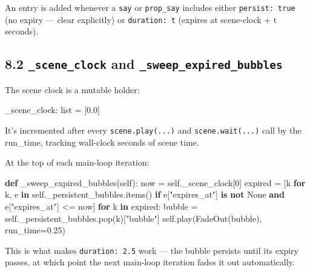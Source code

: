\documentclass[
  11pt,
]{book}
\newenvironment{Shaded}{}{}
\newcommand{\BuiltInTok}[1]{\textcolor[rgb]{0.00,0.50,0.00}{#1}}
\newcommand{\ControlFlowTok}[1]{\textcolor[rgb]{0.00,0.44,0.13}{\textbf{#1}}}
\newcommand{\DecValTok}[1]{\textcolor[rgb]{0.25,0.63,0.44}{#1}}
\newcommand{\FloatTok}[1]{\textcolor[rgb]{0.25,0.63,0.44}{#1}}
\newcommand{\KeywordTok}[1]{\textcolor[rgb]{0.00,0.44,0.13}{\textbf{#1}}}
\newcommand{\NormalTok}[1]{#1}
\newcommand{\OperatorTok}[1]{\textcolor[rgb]{0.40,0.40,0.40}{#1}}
\newcommand{\StringTok}[1]{\textcolor[rgb]{0.25,0.44,0.63}{#1}}
\newcommand{\VariableTok}[1]{\textcolor[rgb]{0.10,0.09,0.49}{#1}}
\begin{document}
An entry is added whenever a \texttt{say} or \texttt{prop\_say} includes
either \texttt{persist:\ true} (no expiry --- clear explicitly) or
\texttt{duration:\ t} (expires at scene-clock + t seconds).

\subsection{\texorpdfstring{8.2 \texttt{\_scene\_clock} and
\texttt{\_sweep\_expired\_bubbles}}{8.2 \_scene\_clock and \_sweep\_expired\_bubbles}}\label{scene_clock-and-_sweep_expired_bubbles}

The scene clock is a mutable holder:

\begin{Shaded}
\begin{Highlighting}[]
\NormalTok{\_scene\_clock: }\BuiltInTok{list} \OperatorTok{=}\NormalTok{ [}\FloatTok{0.0}\NormalTok{]}
\end{Highlighting}
\end{Shaded}

It's incremented after every \texttt{scene.play(...)} and
\texttt{scene.wait(...)} call by the run\_time, tracking wall-clock
seconds of scene time.

At the top of each main-loop iteration:

\begin{Shaded}
\begin{Highlighting}[]
\KeywordTok{def}\NormalTok{ \_sweep\_expired\_bubbles(}\VariableTok{self}\NormalTok{):}
\NormalTok{    now }\OperatorTok{=} \VariableTok{self}\NormalTok{.\_scene\_clock[}\DecValTok{0}\NormalTok{]}
\NormalTok{    expired }\OperatorTok{=}\NormalTok{ [k }\ControlFlowTok{for}\NormalTok{ k, e }\KeywordTok{in} \VariableTok{self}\NormalTok{.\_persistent\_bubbles.items()}
               \ControlFlowTok{if}\NormalTok{ e[}\StringTok{"expires\_at"}\NormalTok{] }\KeywordTok{is} \KeywordTok{not} \VariableTok{None} \KeywordTok{and}\NormalTok{ e[}\StringTok{"expires\_at"}\NormalTok{] }\OperatorTok{\textless{}=}\NormalTok{ now]}
    \ControlFlowTok{for}\NormalTok{ k }\KeywordTok{in}\NormalTok{ expired:}
\NormalTok{        bubble }\OperatorTok{=} \VariableTok{self}\NormalTok{.\_persistent\_bubbles.pop(k)[}\StringTok{"bubble"}\NormalTok{]}
        \VariableTok{self}\NormalTok{.play(FadeOut(bubble), run\_time}\OperatorTok{=}\FloatTok{0.25}\NormalTok{)}
\end{Highlighting}
\end{Shaded}

This is what makes \texttt{duration:\ 2.5} work --- the bubble persists
until its expiry passes, at which point the next main-loop iteration
fades it out automatically.
\end{document}
